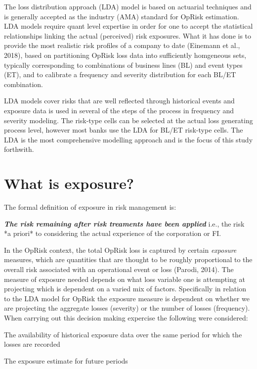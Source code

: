 \documentclass{DissertateUSU}
\begin{document}
The loss distribution approach (LDA) model is based on actuarial
techniques and is generally accepted as the industry (AMA) standard for
OpRisk estimation. LDA models require quant level expertise in order for
one to accept the statistical relationships linking the actual
(perceived) risk exposures. What it has done is to provide the most
realistic risk profiles of a company to date (Einemann et al., 2018),
based on partitioning OpRisk loss data into sufficiently homgeneous
sets, typically corresponding to combinations of business lines (BL) and
event types (ET), and to calibrate a frequency and severity distribution
for each BL/ET combination.\medskip

LDA models cover risks that are well reflected through historical events
and exposure data is used in several of the steps of the process in
frequency and severity modeling. The risk-type cells can be selected at
the actual loss generating process level, however most banks use the LDA
for BL/ET risk-type cells. The LDA is the most comprehensive modelling
approach and is the focus of this study forthwith. \medskip

\section{What is exposure?}
\label{sec:What is exposure?}

The formal definition of exposure in risk management is:

\begin{definition}
\emph{\textbf{The risk remaining after risk treaments have been applied}} i.e., the risk *a priori* to considering the actual experience of the corporation or FI.
\end{definition}

In the OpRisk context, the total OpRisk loss is captured by certain
\emph{exposure} measures, which are quantities that are thought to be
roughly proportional to the overall risk associated with an operational
event or loss (Parodi, 2014). The measure of exposure needed depends on
what loss variable one is attempting at projecting which is dependent on
a varied mix of factors. Specifically in relation to the LDA model for
OpRisk the exposure measure is dependent on whether we are projecting
the aggregate losses (severity) or the number of losses (frequency).
When carrying out this decision making expercise the following were
considered:

\begin{list}{*}{}
\item The availability of historical exposure data over the same period for which the losses are recorded
\item The exposure estimate for future periods
\end{list}
\medskip
\end{document}

